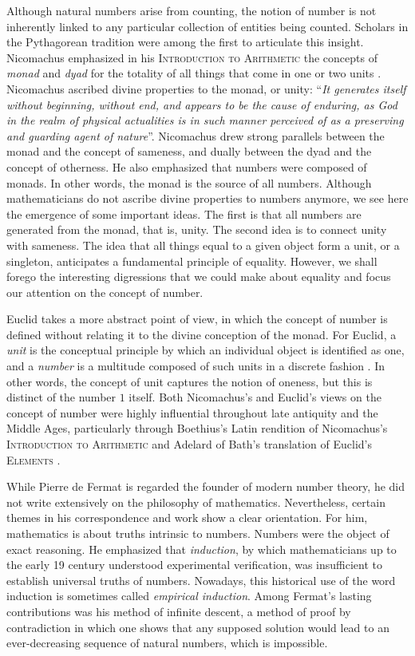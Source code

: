 Although natural numbers arise from counting, the notion of number is not inherently linked to any particular collection of entities being counted. Scholars in the Pythagorean tradition were among the first to articulate this insight. Nicomachus emphasized in his \textsc{Introduction to Arithmetic} the concepts of \emph{monad} and \emph{dyad} for the totality of all things that come in one or two units \cite{nicomachus1926}. Nicomachus ascribed divine properties to the monad, or unity: ``{\itshape It generates itself without beginning, without end, and appears to be the cause of enduring, as God in the realm of physical actualities is in such manner perceived of as a preserving and guarding agent of nature}''. Nicomachus drew strong parallels between the monad and the concept of sameness, and dually between the dyad and the concept of otherness. He also emphasized that numbers were composed of monads. In other words, the monad is the source of all numbers. Although mathematicians do not ascribe divine properties to numbers anymore, we see here the emergence of some important ideas. The first is that all numbers are generated from the monad, that is, unity. The second idea is to connect unity with sameness. The idea that all things equal to a given object form a unit, or a singleton, anticipates a fundamental principle of equality. However, we shall forego the interesting digressions that we could make about equality and focus our attention on the concept of number.

Euclid takes a more abstract point of view, in which the concept of number is defined without relating it to the divine conception of the monad. For Euclid, a \emph{unit} is the conceptual principle by which an individual object is identified as one, and a \emph{number} is a multitude composed of such units in a discrete fashion \cite{euclid2015}. In other words, the concept of unit captures the notion of oneness, but this is distinct of the number $1$ itself. Both Nicomachus's and Euclid's views on the concept of number were highly influential throughout late antiquity and the Middle Ages, particularly through Boethius's Latin rendition of Nicomachus's \textsc{Introduction to Arithmetic} \cite{kaylorphillips2012} and Adelard of Bath's translation of Euclid's \textsc{Elements} \cite{clagett1953}.

While Pierre de Fermat is regarded the founder of modern number theory, he did not write extensively on the philosophy of mathematics. Nevertheless, certain themes in his correspondence and work show a clear orientation. For him, mathematics is about truths intrinsic to numbers. Numbers were the object of exact reasoning. He emphasized that \emph{induction}, by which mathematicians up to the early 19\supth{} century understood experimental verification, was insufficient to establish universal truths of numbers. Nowadays, this historical use of the word induction is sometimes called \emph{empirical induction}. Among Fermat's lasting contributions was his method of infinite descent, a method of proof by contradiction in which one shows that any supposed solution would lead to an ever-decreasing sequence of natural numbers, which is impossible.

